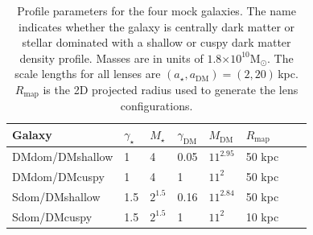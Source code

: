 \documentclass[galley,usenatbib]{mn2e}
\newcommand{\Rmap}{\ensuremath{R_\mathrm{map}}}
\newcommand{\Msun}{\ensuremath{\mathrm{M}_\odot}}
\newcommand{\e}[1]{\ensuremath{\times 10^{#1}}}
\begin{document}
\begin{table}
\begin{tabular}{llllllll}
Galaxy & $\gamma_\star$ & $M_\star$ & $\gamma_\mathrm{DM}$ & $M_\mathrm{DM}$ & $\Rmap$ \\
\hline
DMdom/DMshallow & 1 & 4 & 0.05 & $11^{2.95}$ & 50 kpc\\ %
DMdom/DMcuspy & 1 & 4 & 1 & $11^2$ & 50 kpc \\ %
Sdom/DMshallow & 1.5 & $2^{1.5}$ & 0.16 & $11^{2.84}$ & 50 kpc \\ %
Sdom/DMcuspy & 1.5 & $2^{1.5}$ & 1 & $11^2$ & 10 kpc %
\end{tabular}
\caption{Profile parameters for the four mock galaxies. The name indicates whether 
  the galaxy is centrally dark matter or stellar dominated with a shallow or cuspy 
  dark matter density profile.  Masses are in units of
  $1.8\e{10}\Msun$. The scale lengths for all lenses are
  $(a_\star,a_\mathrm{DM})=(2,20)$\,kpc. $\Rmap$ is the 2D projected radius
used to generate the lens configurations.}
\label{mock galaxy params}
\end{table}
\end{document}
